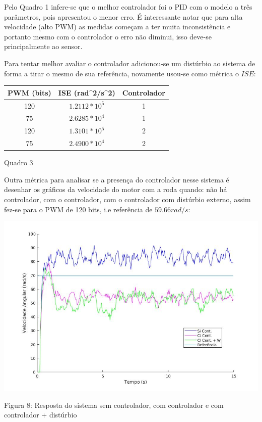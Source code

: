 \documentclass{article}
\begin{document}
Pelo Quadro 1 infere-se que o melhor controlador foi o PID com o modelo a três parâmetros, pois apresentou o menor erro. É interessante notar que para alta velocidade (alto PWM) as medidas começam a ter muita inconsistência e portanto mesmo com o controlador o erro não diminui, isso deve-se principalmente ao sensor.

Para tentar melhor avaliar o controlador adicionou-se um distúrbio ao sistema de forma a tirar o mesmo de sua referência, novamente usou-se como métrica o $ISE$:

\begin{center}
    \begin{tabular}{|c|c|c|}
            \hline
            PWM (bits) & ISE (rad^2/s^2) & Controlador \\
            \hline
            120 & $1.2112*10^5$ & 1 \\
            \hline
            75 & $2.6285*10^4$ & 1\\
            \hline
            120 & $1.3101*10^5$ & 2\\
            \hline
            75 & $2.4900*10^4$ & 2\\
            \hline
    \end{tabular}
    
  \caption{Quadro 3}
\end{center}

Outra métrica para analisar se a presença do controlador nesse sistema é desenhar os gráficos da velocidade do motor com a roda quando: não há controlador, com o controlador, com o controlador com distúrbio externo, assim fez-se para o PWM de 120 bits, i.e referência de $59.66rad/s$:

\begin{center}
    \centering
        \includegraphics[scale=0.5]{imagens/pwm120.jpg}
        
        \caption{Figura 8: Resposta do sistema sem controlador, com controlador e com controlador + distúrbio }
\end{center}
\end{document}

